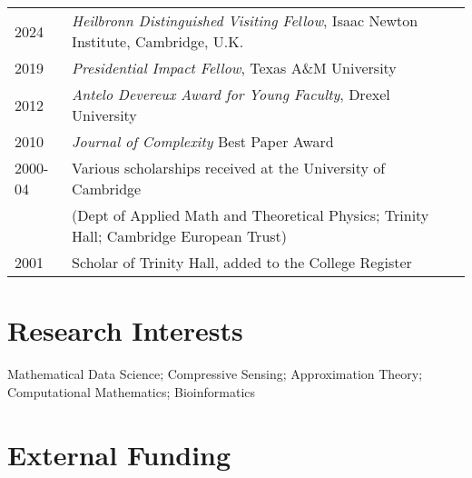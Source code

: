 \documentclass[11pt]{article}
\begin{document}
\begin{tabular}{ll}
2024 & %
{\sl Heilbronn Distinguished Visiting Fellow}, Isaac Newton Institute, Cambridge, U.K.\\
2019 & %
{\sl Presidential Impact Fellow}, Texas A\&M University\\
2012 & %
{\sl Antelo Devereux Award for Young Faculty}, Drexel University\\
2010 & {\sl Journal of Complexity} Best Paper Award\\
2000-04 & Various scholarships received at the University of Cambridge\\
& (Dept  of Applied Math and Theoretical Physics; Trinity Hall; Cambridge European Trust)\\
2001 & Scholar of Trinity Hall, %
added to the College Register
\end{tabular}

\section{Research Interests}

Mathematical Data Science;
Compressive Sensing;
Approximation Theory; 
Computational Mathematics;
Bioinformatics 


 
\section{External Funding}

\end{document}
